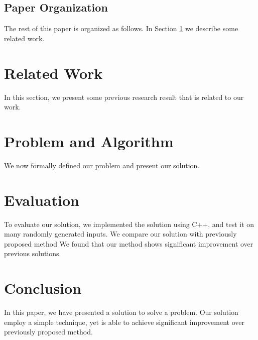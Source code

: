 \documentclass[a4paper,12pt]{nurop}
\begin{document}
\subsection{Paper Organization}
The rest of this paper is organized as follows.  In Section \ref{ch:related}
we describe some related work.

\section{Related Work}
\label{ch:related}
In this section, we present some previous research result
that is related to our work.  

\section{Problem and Algorithm}
We now formally defined our problem and present our solution.

\section{Evaluation}
To evaluate our solution, we implemented the solution 
using C++, and test it on many randomly generated inputs.
We compare our solution with previously proposed method
We found that our method shows significant improvement
over previous solutions.

\section{Conclusion}
In this paper, we have presented a solution to solve a
problem.  Our solution employ a simple technique, yet
is able to achieve significant improvement over previously
proposed method.



\end{document}
